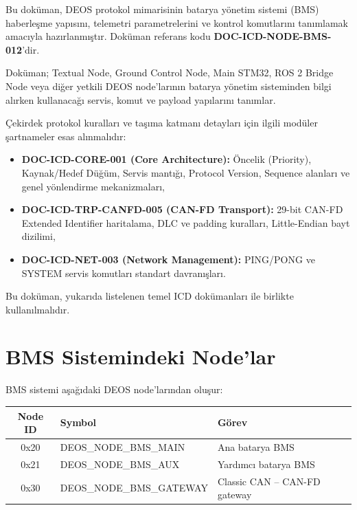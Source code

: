 \documentclass[a4paper,10pt]{article}
\begin{document}
Bu doküman, DEOS protokol mimarisinin batarya yönetim sistemi (BMS) haberleşme yapısını, telemetri parametrelerini ve kontrol komutlarını tanımlamak amacıyla hazırlanmıştır. Doküman referans kodu \textbf{DOC-ICD-NODE-BMS-012}'dir.

Doküman; Textual Node, Ground Control Node, Main STM32,
ROS 2 Bridge Node veya diğer yetkili DEOS node'larının batarya yönetim
sisteminden bilgi alırken kullanacağı servis, komut ve payload
yapılarını tanımlar.

Çekirdek protokol kuralları ve taşıma katmanı detayları için ilgili modüler şartnameler esas alınmalıdır:
\begin{itemize}
    \item \textbf{DOC-ICD-CORE-001 (Core Architecture):} Öncelik (Priority), Kaynak/Hedef Düğüm, Servis mantığı, Protocol Version, Sequence alanları ve genel yönlendirme mekanizmaları,
    \item \textbf{DOC-ICD-TRP-CANFD-005 (CAN-FD Transport):} 29-bit CAN-FD Extended Identifier haritalama, DLC ve padding kuralları, Little-Endian bayt dizilimi,
    \item \textbf{DOC-ICD-NET-003 (Network Management):} PING/PONG ve SYSTEM servis komutları standart davranışları.
\end{itemize}

Bu doküman, yukarıda listelenen temel ICD dokümanları ile birlikte kullanılmalıdır.

\section{BMS Sistemindeki Node'lar}

BMS sistemi aşağıdaki DEOS node'larından oluşur:

\begin{center}
\begin{tabular}{c l l}
\toprule
\textbf{Node ID} & \textbf{Symbol} & \textbf{Görev} \\
\midrule

0x20 &
DEOS\_NODE\_BMS\_MAIN &
Ana batarya BMS \\

0x21 &
DEOS\_NODE\_BMS\_AUX &
Yardımcı batarya BMS \\

0x30 &
DEOS\_NODE\_BMS\_GATEWAY &
Classic CAN -- CAN-FD gateway \\

\bottomrule
\end{tabular}
\end{center}
\end{document}
